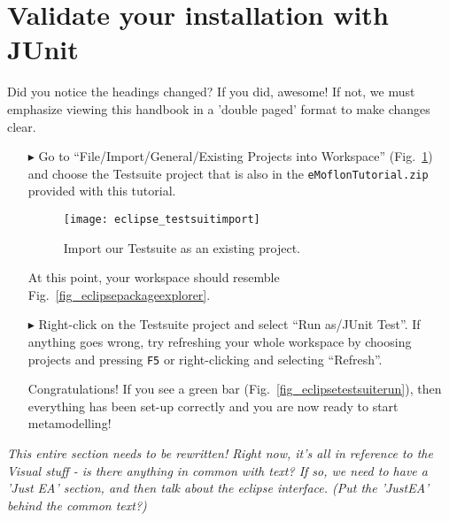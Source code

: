 \pagebreak
\genHeader

\section{Validate your installation with JUnit}
\label{sec:junit}

Did you notice the headings changed? If you did, awesome! If not, we must emphasize viewing this handbook in a 'double paged' format to make changes clear.

\begin{enumerate}
\item[$\blacktriangleright$] Go to ``File/Import/General/Existing Projects into Workspace'' (Fig.~\ref{fig_eclipseTestsuiteImport}) and choose the Testsuite project that is also in the \texttt{eMoflonTutorial.zip} provided with this tutorial. 

\begin{figure}[htbp]
	\centering
  \texttt{[image: eclipse\_testsuitimport]}
	\caption{Import our Testsuite as an existing project.}
	\label{fig_eclipseTestsuiteImport}
\end{figure} 


\item[] At this point, your workspace should resemble Fig.~\ref{fig_eclipsepackageexplorer}.


\item[$\blacktriangleright$] Right-click on the Testsuite project and select ``Run as/JUnit Test''.
If anything goes wrong, try refreshing your whole workspace by choosing projects and pressing \texttt{F5} or right-clicking and selecting ``Refresh''.


Congratulations!  If you see a green bar  (Fig.~\ref{fig_eclipsetestsuiterun}), then everything has been set-up correctly and you are now ready to start metamodelling!

\end{enumerate}

\newpage
\mbox{}
\newpage


\emph{This entire section needs to be rewritten! Right now, it's all in reference to the Visual stuff - is there anything in common with text? If so, we need to have a
'Just EA' section, and then talk about the eclipse interface. (Put the 'JustEA' behind the common text?)}

